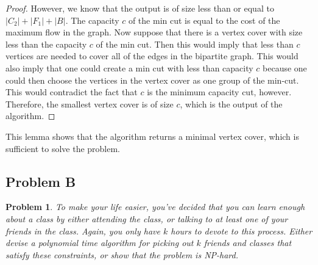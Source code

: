 \documentclass[psamsfonts]{amsart}
\newtheorem{prob}{Problem}[section]
\newenvironment{sol}{{\bfseries Solution}}{\qedsymbol}
\theoremstyle{definition}
\theoremstyle{remark}
\numberwithin{equation}{section}
\begin{document}
\begin{sol}
\begin{proof}
However, we know that the output is of size less than or equal to $|C_2| + |F_1| + |B|$. The capacity $c$ of the min cut is equal to the cost of the maximum flow in the graph. Now suppose that there is a vertex cover with size less than the capacity $c$ of the min cut. Then this would imply that less than $c$ vertices are needed to cover all of the edges in the bipartite graph. This would also imply that one could create a min cut with less than capacity $c$ because one could then choose the vertices in the vertex cover as one group of the min-cut. This would contradict the fact that $c$ is the minimum capacity cut, however. Therefore, the smallest vertex cover is of size $c$, which is the output of the algorithm.
\end{proof}

This lemma shows that the algorithm returns a minimal vertex cover, which is sufficient to solve the problem. 
\end{sol}

\subsection{Problem B}

\begin{prob}
To make your life easier, you've decided that you can learn enough about a class by either attending the class, or talking to at least one of your friends in the class. Again, you only have $k$ hours to devote to this process. Either devise a polynomial time algorithm for picking out $k$ friends and classes that satisfy these constraints, or show that the problem is NP-hard.
\end{prob}
\end{document}
